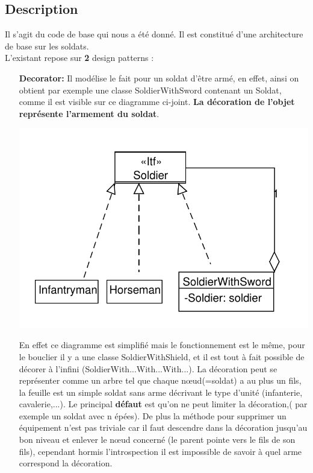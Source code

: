 ﻿\documentclass[12pt]{article}
\begin{document}
\subsection{Description}
Il s'agit du code de base qui nous a été donné. Il est constitué d'une architecture de base sur les soldats.\\
L'existant repose sur \textbf{2} design patterns :
\begin{enumerate}
\item[\textbf{Decorator:}] Il modélise le fait pour un soldat d'être armé,
en effet, ainsi on obtient par exemple une classe SoldierWithSword contenant un Soldat, comme il est visible sur ce diagramme ci-joint.
\textbf{La décoration de l'objet représente l'armement du soldat}.

\includegraphics[scale=1]{../UML/Realdecorator}

En effet ce diagramme est simplifié mais le fonctionnement est le même,
pour le bouclier il y a une classe SoldierWithShield, et il est tout à fait 
possible de décorer à l'infini (SoldierWith...With...With...).
La décoration peut se représenter comme un arbre tel que chaque nœud(=soldat) a au plus un fils, la feuille est un simple soldat sans arme décrivant le type d'unité
(infanterie, cavalerie,...).
Le principal \textbf{défaut} est qu'on ne peut limiter la décoration,( par exemple un soldat avec n épées). De plus la méthode pour supprimer un équipement n'est pas triviale car il faut descendre dans la décoration jusqu'au bon niveau et enlever
le nœud concerné (le parent pointe vers le fils de son fils), cependant
hormis l'introspection il est impossible de savoir à quel arme correspond la décoration.


\end{enumerate}
\end{document}
